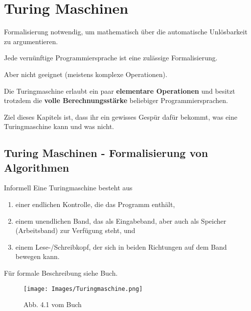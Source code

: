 \section{Turing Maschinen}
    
    
        Formalisierung notwendig, um mathematisch über die automatische Unlösbarkeit zu argumentieren.
    
        Jede vernünftige Programmiersprache ist eine zulässige Formalisierung. 
    
        Aber nicht geeignet (meistens komplexe Operationen).
    
        Die Turingmaschine erlaubt ein paar \textbf{elementare Operationen} und besitzt trotzdem die \textbf{volle Berechnungsstärke} beliebiger Programmiersprachen.
    
        Ziel dieses Kapitels ist, dass ihr ein gewisses Gespür dafür bekommt, was eine Turingmaschine kann und was nicht.
    
    
    
        \subsection{Turing Maschinen - Formalisierung von Algorithmen}
        \begin{subbox}{Informell}
            Eine Turingmaschine besteht aus 
            \begin{enumerate}[label=(\roman*)]
                \item einer endlichen Kontrolle, die das Programm enthält,
                \item einem unendlichen Band, das als Eingabeband, aber auch als Speicher (Arbeitsband) zur Verfügung steht, und 
                \item einem Lese-/Schreibkopf, der sich in beiden Richtungen auf dem Band bewegen kann.
            \end{enumerate}
        \end{subbox}
        Für formale Beschreibung siehe Buch.
    
        \begin{figure}[htp]
            \centering
            \texttt{[image: Images/Turingmaschine.png]}
            \caption{Abb. 4.1 vom Buch}
        \end{figure}
    
